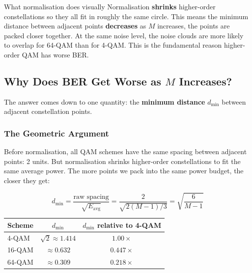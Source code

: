 \begin{IntuitionBox}{What normalisation does visually}
Normalisation \textbf{shrinks} higher-order constellations so they all fit in roughly the same circle. This means the minimum distance between adjacent points \textbf{decreases} as $M$ increases, the points are packed closer together. At the same noise level, the noise clouds are more likely to overlap for 64-QAM than for 4-QAM. This is the fundamental reason higher-order QAM has worse BER.
\end{IntuitionBox}

\subsection{Why Does BER Get Worse as $M$ Increases?}

The answer comes down to one quantity: the \textbf{minimum distance} $d_{\min}$ between adjacent constellation points.

\subsubsection{The Geometric Argument}

Before normalisation, all QAM schemes have the same spacing between adjacent points: 2 units. But normalisation shrinks higher-order constellations to fit the same average power. The more points we pack into the same power budget, the closer they get:

\begin{equation}
d_{\min} = \frac{\text{raw spacing}}{\sqrt{E_{\text{avg}}}} = \frac{2}{\sqrt{2(M-1)/3}} = \sqrt{\frac{6}{M-1}}
\end{equation}

\begin{center}
\renewcommand{\arraystretch}{1.3}
\begin{tabular}{lcc}
\hline
\textbf{Scheme} & $d_{\min}$ & $d_{\min}$ relative to 4-QAM \\
\hline
4-QAM & $\sqrt{2} \approx 1.414$ & $1.00\times$ \\
16-QAM & $\approx 0.632$ & $0.447\times$ \\
64-QAM & $\approx 0.309$ & $0.218\times$ \\
\hline
\end{tabular}
\end{center}

